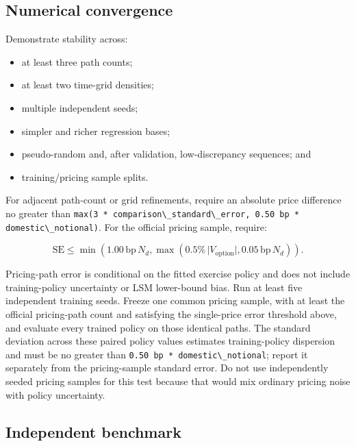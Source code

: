 \documentclass[conference]{IEEEtran}
\newcommand{\passthrough}[1]{#1}
\providecommand{\tightlist}{}
\begin{document}
\subsection{Numerical convergence}\label{113-numerical-convergence}

Demonstrate stability across:

\begin{itemize}
\tightlist
\item
  at least three path counts;
\item
  at least two time-grid densities;
\item
  multiple independent seeds;
\item
  simpler and richer regression bases;
\item
  pseudo-random and, after validation, low-discrepancy sequences; and
\item
  training/pricing sample splits.
\end{itemize}

For adjacent path-count or grid refinements, require an absolute price
difference no greater than
\passthrough{\lstinline!max(3 * comparison\_standard\_error, 0.50 bp * domestic\_notional)!}.
For the official pricing sample, require:

\begin{equation*}
  \mathrm{SE}
  \leq
  \min\!\left(
    1.00\,\mathrm{bp}\,N_d,
    \max\!\left(0.5\%\,\lvert V_{\mathrm{option}}\rvert,
                 0.05\,\mathrm{bp}\,N_d\right)
  \right).
\end{equation*}

Pricing-path error is conditional on the fitted exercise policy and does
not include training-policy uncertainty or LSM lower-bound bias. Run at
least five independent training seeds. Freeze one common pricing sample,
with at least the official pricing-path count and satisfying the
single-price error threshold above, and evaluate every trained policy on
those identical paths. The standard deviation across these paired policy
values estimates training-policy dispersion and must be no greater than
\passthrough{\lstinline!0.50 bp * domestic\_notional!}; report it
separately from the pricing-sample standard error. Do not use
independently seeded pricing samples for this test because that would
mix ordinary pricing noise with policy uncertainty.

\subsection{Independent benchmark}\label{114-independent-benchmark}
\end{document}
